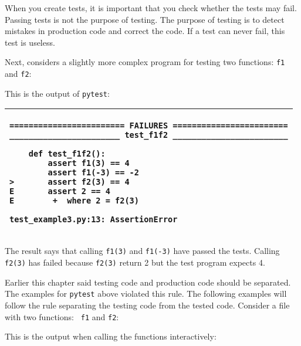 
When you create tests, it is important that you check whether the
tests may fail. Passing tests is not the purpose of testing.  The
purpose of testing is to detect mistakes in production code and
correct the code.  If a test can never fail, this test is useless.

Next, considers a slightly more complex program for testing two
functions: {\tt f1} and {\tt f2}:

\resetlinenumber[1]
\linenumbers
\begin{tt}
  
\end{tt}
\nolinenumbers

This is the output of {\tt pytest}:

\vspace{0.2in}

\noindent
\begin{tabular}{|p{5in}|}\hline
\begin{verbatim}
======================== FAILURES ========================
_______________________ test_f1f2 ________________________

    def test_f1f2():
        assert f1(3) == 4
        assert f1(-3) == -2
>       assert f2(3) == 4
E       assert 2 == 4
E        +  where 2 = f2(3)

test_example3.py:13: AssertionError
\end{verbatim}
\\ \hline
\end{tabular}
\vspace{0.2in}

The result says that calling {\tt f1(3)} and {\tt f1(-3)} have passed
the tests. Calling {\tt f2(3)} has failed because {\tt f2(3)}
return 2 but the test program expects 4.

Earlier this chapter said testing code and production code should be
separated. The examples for {\tt pytest} above violated this rule.
The following examples will follow the rule separating the testing
code from the tested code. Consider a file with two functions: {\tt
  f1} and {\tt f2}:

\resetlinenumber[1]
\linenumbers
\begin{tt}
  
\end{tt}
\nolinenumbers

This is the output when calling the functions interactively:

